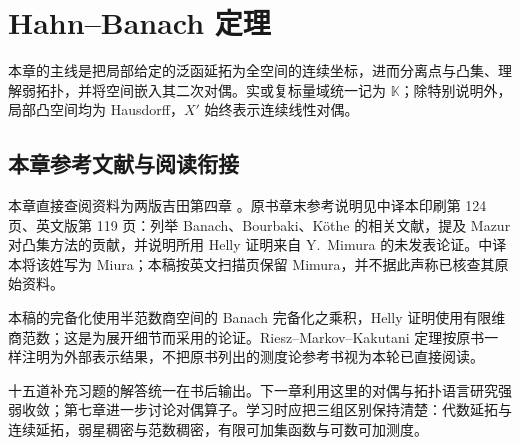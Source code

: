 \chapter{Hahn--Banach 定理}\label{ch:yosida-04}

本章的主线是把局部给定的泛函延拓为全空间的连续坐标，进而分离点与凸集、理解弱拓扑，并将空间嵌入其二次对偶。实或复标量域统一记为 $\mathbb K$；除特别说明外，局部凸空间均为 Hausdorff，$X'$ 始终表示连续线性对偶。












\section*{本章参考文献与阅读衔接}
{}
本章直接查阅资料为两版吉田第四章 \cite{yosida-zh,yosida-en}。原书章末参考说明见中译本印刷第 124 页、英文版第 119 页：列举 Banach、Bourbaki、K\"othe 的相关文献，提及 Mazur 对凸集方法的贡献，并说明所用 Helly 证明来自 Y.~Mimura 的未发表论证。中译本将该姓写为 Miura；本稿按英文扫描页保留 Mimura，并不据此声称已核查其原始资料。

本稿的完备化使用半范数商空间的 Banach 完备化之乘积，Helly 证明使用有限维商范数；这是为展开细节而采用的论证。Riesz--Markov--Kakutani 定理按原书一样注明为外部表示结果，不把原书列出的测度论参考书视为本轮已直接阅读。

十五道补充习题的解答统一在书后输出。下一章利用这里的对偶与拓扑语言研究强弱收敛；第七章进一步讨论对偶算子。学习时应把三组区别保持清楚：代数延拓与连续延拓，弱星稠密与范数稠密，有限可加集函数与可数可加测度。
